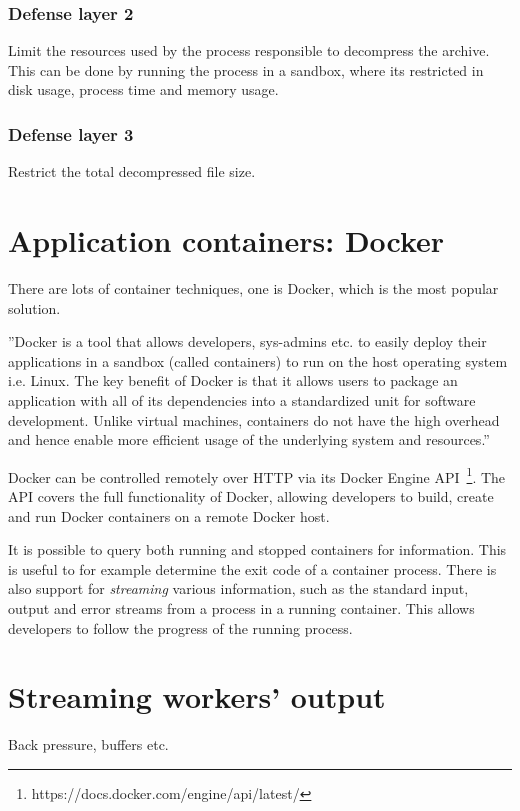 \subsubsection*{Defense layer 2}
\label{defense_layer_2}

Limit the resources used by the process responsible to decompress the archive. This can be done by running the process in a sandbox, where its restricted in disk usage, process time and memory usage.

\subsubsection*{Defense layer 3}

Restrict the total decompressed file size.

\section{Application containers: Docker}


There are lots of container techniques, one is Docker, which is the most popular solution. %

''Docker is a tool that allows developers, sys-admins etc. to easily deploy their applications in a sandbox (called containers) to run on the host operating system i.e. Linux. The key benefit of Docker is that it allows users to package an application with all of its dependencies into a standardized unit for software development. Unlike virtual machines, containers do not have the high overhead and hence enable more efficient usage of the underlying system and resources.''~\cite{2019ABeginners}


Docker can be controlled remotely over HTTP via its Docker Engine API~\footnote{https://docs.docker.com/engine/api/latest/}. The API covers the full functionality of Docker, allowing developers to build, create and run Docker containers on a remote Docker host. 

It is possible to query both running and stopped containers for information. This is useful to for example determine the exit code of a container process. There is also support for \textit{streaming} various information, such as the standard input, output and error streams from a process in a running container. This allows developers to follow the progress of the running process.

\section{Streaming workers' output}

Back pressure, buffers etc.

